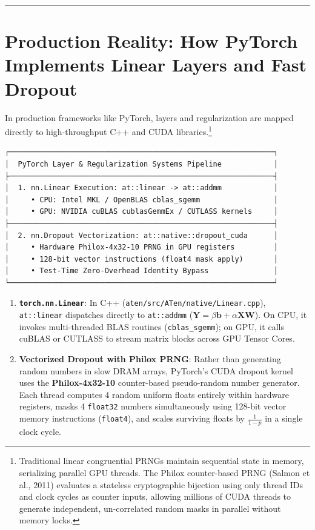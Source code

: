 \documentclass[
  letterpaper,
]{scrbook}
\providecommand{\tightlist}{%
  \setlength{\itemsep}{0pt}\setlength{\parskip}{0pt}}
\begin{document}
\begin{center}\rule{0.5\linewidth}{0.5pt}\end{center}

\section{Production Reality: How PyTorch Implements Linear Layers and
Fast
Dropout}\label{production-reality-how-pytorch-implements-linear-layers-and-fast-dropout}

In production frameworks like PyTorch, layers and regularization are
mapped directly to high-throughput C++ and CUDA libraries.\footnote{Traditional
  linear congruential PRNGs maintain sequential state in memory,
  serializing parallel GPU threads. The Philox counter-based PRNG
  (Salmon et al., 2011) evaluates a stateless cryptographic bijection
  using only thread IDs and clock cycles as counter inputs, allowing
  millions of CUDA threads to generate independent, un-correlated random
  masks in parallel without memory locks.}

\begin{verbatim}
┌─────────────────────────────────────────────────────────────┐
│  PyTorch Layer & Regularization Systems Pipeline            │
├─────────────────────────────────────────────────────────────┤
│  1. nn.Linear Execution: at::linear -> at::addmm            │
│     • CPU: Intel MKL / OpenBLAS cblas_sgemm                 │
│     • GPU: NVIDIA cuBLAS cublasGemmEx / CUTLASS kernels     │
├─────────────────────────────────────────────────────────────┤
│  2. nn.Dropout Vectorization: at::native::dropout_cuda      │
│     • Hardware Philox-4x32-10 PRNG in GPU registers         │
│     • 128-bit vector instructions (float4 mask apply)       │
│     • Test-Time Zero-Overhead Identity Bypass               │
└─────────────────────────────────────────────────────────────┘
\end{verbatim}

\begin{enumerate}
\def\labelenumi{\arabic{enumi}.}
\tightlist
\item
  \textbf{\texttt{torch.nn.Linear}}: In C++
  (\texttt{aten/src/ATen/native/Linear.cpp}), \texttt{at::linear}
  dispatches directly to \texttt{at::addmm}
  (\(\mathbf{Y} = \beta \mathbf{b} + \alpha \mathbf{X} \mathbf{W}\)). On
  CPU, it invokes multi-threaded BLAS routines (\texttt{cblas\_sgemm});
  on GPU, it calls cuBLAS or CUTLASS to stream matrix blocks across GPU
  Tensor Cores.
\item
  \textbf{Vectorized Dropout with Philox PRNG}: Rather than generating
  random numbers in slow DRAM arrays, PyTorch's CUDA dropout kernel uses
  the \textbf{Philox-4x32-10} counter-based pseudo-random number
  generator. Each thread computes 4 random uniform floats entirely
  within hardware registers, masks 4 \texttt{float32} numbers
  simultaneously using 128-bit vector memory instructions
  (\texttt{float4}), and scales surviving floats by \(\frac{1}{1-p}\) in
  a single clock cycle.
\end{enumerate}
\end{document}
